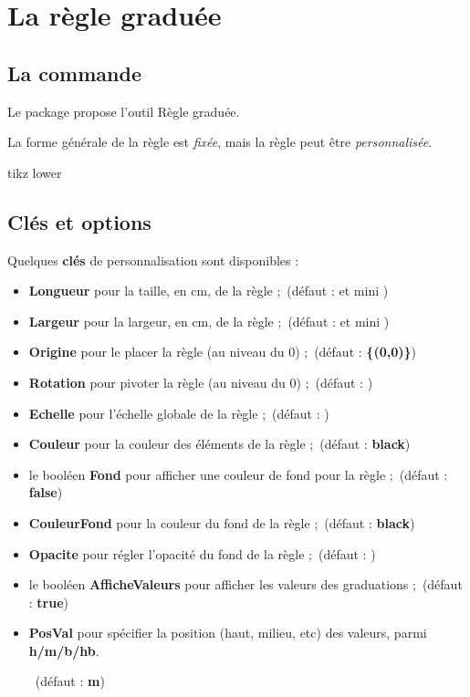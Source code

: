 \documentclass[french,a4paper,11pt]{article}
\newcommand\Cle[1]{{\bfseries\sffamily\textlangle #1\textrangle}}
\begin{document}
\section{La règle graduée}

\subsection{La commande}

\begin{cautionblock}
Le package propose l'outil \textsf{Règle graduée}.

La forme générale de la règle est \textit{fixée}, mais la règle peut être \textit{personnalisée}.
\end{cautionblock}

\begin{PresentationCode}{tikz lower}
\tkzRegle
\end{PresentationCode}

\subsection{Clés et options}

\begin{tipblock}
Quelques \Cle{clés} de personnalisation sont disponibles :

\begin{itemize}
	\item \Cle{Longueur} pour la taille, en cm, de la règle ;\hfill~(défaut : \Cle{12} et mini \Cle{3})
	\item \Cle{Largeur} pour la largeur, en cm, de la règle ;\hfill~(défaut : \Cle{1.5} et mini \Cle{1.25})
	\item \Cle{Origine} pour le placer la règle (au niveau du $0$) ;\hfill~(défaut : \Cle{\{(0,0)\}})
	\item \Cle{Rotation} pour pivoter la règle (au niveau du $0$) ;\hfill~(défaut : \Cle{0})
	\item \Cle{Echelle} pour l'échelle globale de la règle ;\hfill~(défaut : \Cle{1})
	\item \Cle{Couleur} pour la couleur des éléments de la règle ;\hfill~(défaut : \Cle{black})
	\item le booléen \Cle{Fond} pour afficher une couleur de fond pour la règle ;\hfill~(défaut : \Cle{false})
	\item \Cle{CouleurFond} pour la couleur du fond de la règle ;\hfill~(défaut : \Cle{black})
	\item \Cle{Opacite} pour régler l'opacité du fond de la règle ;\hfill~(défaut : \Cle{0.5})
	\item le booléen \Cle{AfficheValeurs} pour afficher les valeurs des graduations ;\hfill~(défaut : \Cle{true})
	\item \Cle{PosVal} pour spécifier la position (haut, milieu, etc) des valeurs, parmi \Cle{h/m/b/hb}.
	
	\hfill~(défaut : \Cle{m})
\end{itemize}
\vspace*{-\baselineskip}\leavevmode
\end{tipblock}
\end{document}
